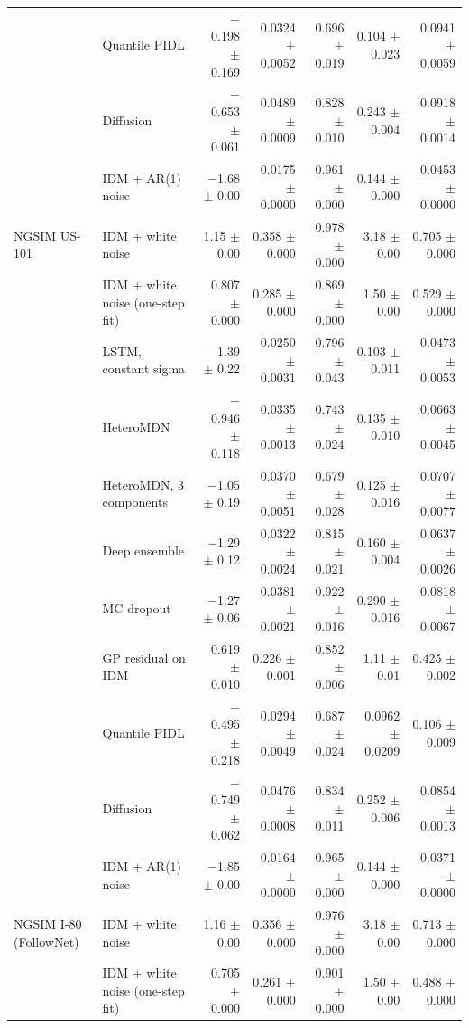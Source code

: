 \begin{longtable}{llrrrrr}
 & Quantile PIDL & $-$0.198 $\pm$ 0.169 & 0.0324 $\pm$ 0.0052 & 0.696 $\pm$ 0.019 & 0.104 $\pm$ 0.023 & 0.0941 $\pm$ 0.0059 \\
 & Diffusion & $-$0.653 $\pm$ 0.061 & 0.0489 $\pm$ 0.0009 & 0.828 $\pm$ 0.010 & 0.243 $\pm$ 0.004 & 0.0918 $\pm$ 0.0014 \\
 & IDM + AR(1) noise & $-$1.68 $\pm$ 0.00 & 0.0175 $\pm$ 0.0000 & 0.961 $\pm$ 0.000 & 0.144 $\pm$ 0.000 & 0.0453 $\pm$ 0.0000 \\
\midrule
NGSIM US-101 & IDM + white noise & 1.15 $\pm$ 0.00 & 0.358 $\pm$ 0.000 & 0.978 $\pm$ 0.000 & 3.18 $\pm$ 0.00 & 0.705 $\pm$ 0.000 \\
 & IDM + white noise (one-step fit) & 0.807 $\pm$ 0.000 & 0.285 $\pm$ 0.000 & 0.869 $\pm$ 0.000 & 1.50 $\pm$ 0.00 & 0.529 $\pm$ 0.000 \\
 & LSTM, constant sigma & $-$1.39 $\pm$ 0.22 & 0.0250 $\pm$ 0.0031 & 0.796 $\pm$ 0.043 & 0.103 $\pm$ 0.011 & 0.0473 $\pm$ 0.0053 \\
 & HeteroMDN & $-$0.946 $\pm$ 0.118 & 0.0335 $\pm$ 0.0013 & 0.743 $\pm$ 0.024 & 0.135 $\pm$ 0.010 & 0.0663 $\pm$ 0.0045 \\
 & HeteroMDN, 3 components & $-$1.05 $\pm$ 0.19 & 0.0370 $\pm$ 0.0051 & 0.679 $\pm$ 0.028 & 0.125 $\pm$ 0.016 & 0.0707 $\pm$ 0.0077 \\
 & Deep ensemble & $-$1.29 $\pm$ 0.12 & 0.0322 $\pm$ 0.0024 & 0.815 $\pm$ 0.021 & 0.160 $\pm$ 0.004 & 0.0637 $\pm$ 0.0026 \\
 & MC dropout & $-$1.27 $\pm$ 0.06 & 0.0381 $\pm$ 0.0021 & 0.922 $\pm$ 0.016 & 0.290 $\pm$ 0.016 & 0.0818 $\pm$ 0.0067 \\
 & GP residual on IDM & 0.619 $\pm$ 0.010 & 0.226 $\pm$ 0.001 & 0.852 $\pm$ 0.006 & 1.11 $\pm$ 0.01 & 0.425 $\pm$ 0.002 \\
 & Quantile PIDL & $-$0.495 $\pm$ 0.218 & 0.0294 $\pm$ 0.0049 & 0.687 $\pm$ 0.024 & 0.0962 $\pm$ 0.0209 & 0.106 $\pm$ 0.009 \\
 & Diffusion & $-$0.749 $\pm$ 0.062 & 0.0476 $\pm$ 0.0008 & 0.834 $\pm$ 0.011 & 0.252 $\pm$ 0.006 & 0.0854 $\pm$ 0.0013 \\
 & IDM + AR(1) noise & $-$1.85 $\pm$ 0.00 & 0.0164 $\pm$ 0.0000 & 0.965 $\pm$ 0.000 & 0.144 $\pm$ 0.000 & 0.0371 $\pm$ 0.0000 \\
\midrule
NGSIM I-80 (FollowNet) & IDM + white noise & 1.16 $\pm$ 0.00 & 0.356 $\pm$ 0.000 & 0.976 $\pm$ 0.000 & 3.18 $\pm$ 0.00 & 0.713 $\pm$ 0.000 \\
 & IDM + white noise (one-step fit) & 0.705 $\pm$ 0.000 & 0.261 $\pm$ 0.000 & 0.901 $\pm$ 0.000 & 1.50 $\pm$ 0.00 & 0.488 $\pm$ 0.000 \\

\end{longtable}

